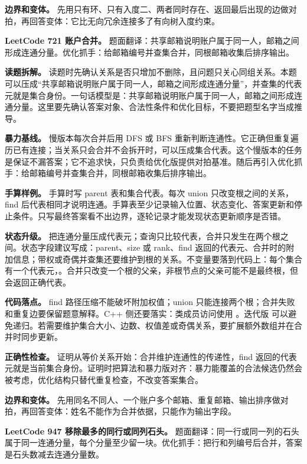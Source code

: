 \textbf{边界和变体。} 先用只有环、只有入度二、两者同时存在、返回最后出现的边做对拍，再回答变体：它比无向冗余连接多了有向树入度约束。

\noindent\textbf{LeetCode 721 账户合并。} 题面翻译：共享邮箱说明账户属于同一人，邮箱之间形成连通分量。优化抓手：给邮箱编号并查集合并，同根邮箱收集后排序输出。

\textbf{读题拆解。} 读题时先确认关系是否只增加不删除，且问题只关心同组关系。本题可以压成“共享邮箱说明账户属于同一人，邮箱之间形成连通分量”，并查集的代表元就是集合身份。一句话模型是：共享邮箱说明账户属于同一人，邮箱之间形成连通分量。这里要先确认答案对象、合法性条件和优化目标，不要把题型名字当成推导。

\textbf{暴力基线。} 慢版本每次合并后用 DFS 或 BFS 重新判断连通性。它正确但重复遍历已有连接；当关系只会合并不会拆开时，可以压成集合代表。这个慢版本的任务是保证不漏答案；它不追求快，只负责给优化版提供对拍基准。随后再引入优化抓手：给邮箱编号并查集合并，同根邮箱收集后排序输出。

\textbf{手算样例。} 手算时写 parent 表和集合代表。每次 union 只改变根之间的关系，find 后代表相同才说明连通。手算表至少记录输入位置、状态变化、答案更新和停止条件。只写最终答案看不出边界，逐轮记录才能发现状态更新顺序是否错。

\textbf{状态升级。} 把连通分量压成代表元；查询只比较代表，合并只发生在两个根之间。状态字段建议写成：parent、size 或 rank、find 返回的代表元、合并时的附加信息；带权或奇偶并查集还要维护到根的关系。不变量要落到代码上：每个集合有一个代表元，。合并只改变一个根的父亲，非根节点的父亲可能不是最终根，但  会返回正确代表。

\textbf{代码落点。} find 路径压缩不能破坏附加权值；union 只能连接两个根；合并失败和重复边要保留题意解释。C++ 侧还要落实：类成员访问使用 。迭代版  可以避免递归。若需要维护集合大小、边数、权值差或奇偶关系，要扩展额外数组并在合并时同步更新。

\textbf{正确性检查。} 证明从等价关系开始：合并维护连通性的传递性，find 返回的代表元就是当前集合身份。证明时把算法和暴力版对齐：暴力能覆盖的合法候选仍然会被考虑，优化结构只替代重复检查，不改变答案集合。

\textbf{边界和变体。} 先用同名不同人、一个账户多个邮箱、重复邮箱、输出排序做对拍，再回答变体：姓名不能作为合并依据，只能作为输出字段。

\noindent\textbf{LeetCode 947 移除最多的同行或同列石头。} 题面翻译：同一行或同一列的石头属于同一连通分量，每个分量至少留一块。优化抓手：把行和列编号后合并，答案是石头数减去连通分量数。

